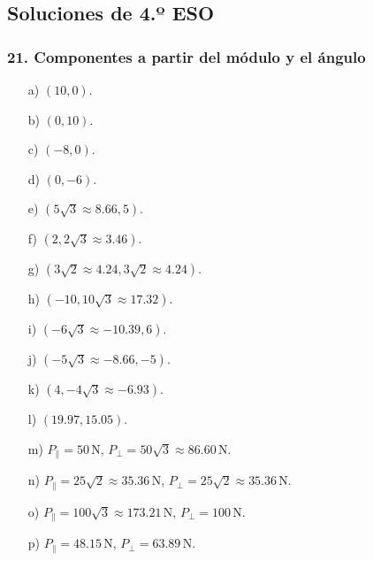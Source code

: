 \subsection{Soluciones de 4.º ESO}

\subsubsection*{21. Componentes a partir del módulo y el ángulo}
\begin{enumerate}
    \item[a)] $(10,0)$.
    \item[b)] $(0,10)$.
    \item[c)] $(-8,0)$.
    \item[d)] $(0,-6)$.
    \item[e)] $(5\sqrt{3}\approx8.66,5)$.
    \item[f)] $(2,2\sqrt{3}\approx3.46)$.
    \item[g)] $(3\sqrt{2}\approx4.24,3\sqrt{2}\approx4.24)$.
    \item[h)] $(-10,10\sqrt{3}\approx17.32)$.
    \item[i)] $(-6\sqrt{3}\approx-10.39,6)$.
    \item[j)] $(-5\sqrt{3}\approx-8.66,-5)$.
    \item[k)] $(4,-4\sqrt{3}\approx-6.93)$.
    \item[l)] $(19.97,15.05)$.
    \item[m)] $P_{\parallel}=50\,\mathrm{N}$,
    $P_{\perp}=50\sqrt{3}\approx86.60\,\mathrm{N}$.
    \item[n)] $P_{\parallel}=25\sqrt{2}\approx35.36\,\mathrm{N}$,
    $P_{\perp}=25\sqrt{2}\approx35.36\,\mathrm{N}$.
    \item[o)] $P_{\parallel}=100\sqrt{3}\approx173.21\,\mathrm{N}$,
    $P_{\perp}=100\,\mathrm{N}$.
    \item[p)] $P_{\parallel}=48.15\,\mathrm{N}$,
    $P_{\perp}=63.89\,\mathrm{N}$.
\end{enumerate}

